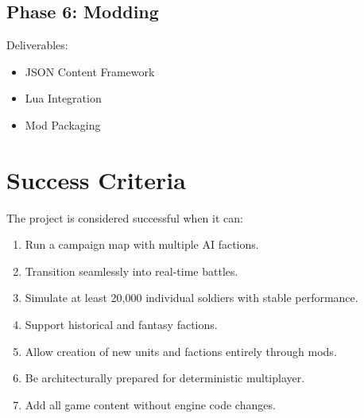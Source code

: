 \documentclass[11pt,a4paper]{article}
\begin{document}
\subsection{Phase 6: Modding}

Deliverables:

\begin{itemize}

    \item JSON Content Framework

    \item Lua Integration

    \item Mod Packaging

\end{itemize}

\section{Success Criteria}

The project is considered successful when it can:

\begin{enumerate}

    \item Run a campaign map with multiple AI factions.

    \item Transition seamlessly into real-time battles.

    \item Simulate at least 20,000 individual soldiers with stable performance.

    \item Support historical and fantasy factions.

    \item Allow creation of new units and factions entirely through mods.

    \item Be architecturally prepared for deterministic multiplayer.

    \item Add all game content without engine code changes.

\end{enumerate}
\end{document}
